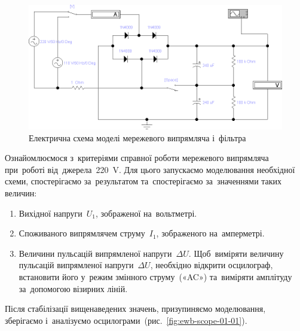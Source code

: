 \documentclass[
	a4paper,
	oneside,
	BCOR = 10mm,
	DIV = 12,
	12pt,
	headings = normal,
]{scrartcl}
\begin{document}
			\begin{figure}[!htbp]
				\centering
				\includegraphics[height = 12\baselineskip]{./assets/y03s02-pcdiag-lab-01-p00.png}
				\caption{Електрична схема моделі мережевого випрямляча і~фільтра}
				\label{fig:ewb-rectifier}
			\end{figure}

			Ознайомлюємося з~критеріями справної роботи мережевого випрямляча при~роботі від~джерела~\SI{220}{\volt}. Для цього запускаємо моделювання необхідної схеми, спостерігаємо за~результатом та~спостерігаємо за~значеннями таких величин:
			\begin{enumerate}
				\item Вихідної напруги~$U_1$, зображеної на~вольтметрі. 
				\item Споживаного випрямлячем струму~$I_1$, зображеного на~амперметрі.
				\item Величини пульсацій випрямленої напруги~$\Delta U$. Щоб~виміряти величину пульсацій випрямленої напруги~$\Delta U$, необхідно відкрити осцилограф, встановити його у~режим змінного струму~(«\textenglish{AC}») та~виміряти амплітуду за~допомогою візирних ліній.
			\end{enumerate}
			Після стабілізації вищенаведених значень, призупиняємо моделювання, зберігаємо і~аналізуємо осцилограми~(рис.~\ref{fig:ewb-scope-01-01}). 
\end{document}
